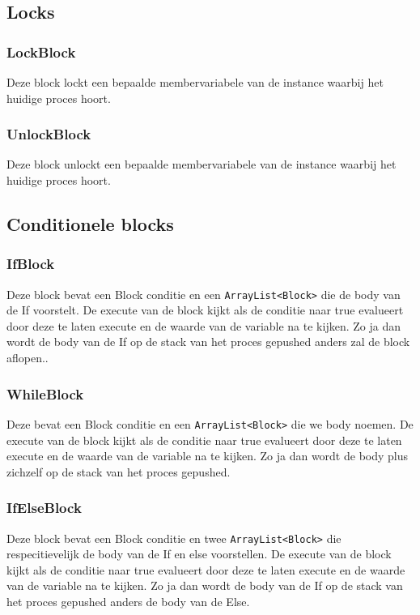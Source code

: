 \documentclass[]{article}
\begin{document}
\subsection{Locks}
\subsubsection{LockBlock}
Deze block lockt een bepaalde membervariabele van de instance waarbij het huidige proces hoort.
\subsubsection{UnlockBlock}
Deze block unlockt een bepaalde membervariabele van de instance waarbij het huidige proces hoort.

\subsection{Conditionele blocks}
\subsubsection{IfBlock}
Deze block bevat een Block conditie en een \texttt{ArrayList<Block>} \cite{arraylist} die de body van de If voorstelt. De execute van de block kijkt als de conditie naar true evalueert door deze te laten execute en de waarde van de variable na te kijken. Zo ja dan wordt de body van de If op de stack van het proces gepushed anders zal de block aflopen..
\subsubsection{WhileBlock}
Deze bevat een Block conditie en een \texttt{ArrayList<Block>} \cite{arraylist} die we body noemen. De execute van de block kijkt als de conditie naar true evalueert door deze te laten execute en de waarde van de variable na te kijken. Zo ja dan wordt de body plus zichzelf op de stack van het proces gepushed.
\subsubsection{IfElseBlock}
Deze block bevat een Block conditie en twee \texttt{ArrayList<Block>} \cite{arraylist} die respecitievelijk de body van de If en else voorstellen. De execute van de block kijkt als de conditie naar true evalueert door deze te laten execute en de waarde van de variable na te kijken. Zo ja dan wordt de body van de If  op de stack van het proces gepushed anders de body van de Else.
\end{document}
